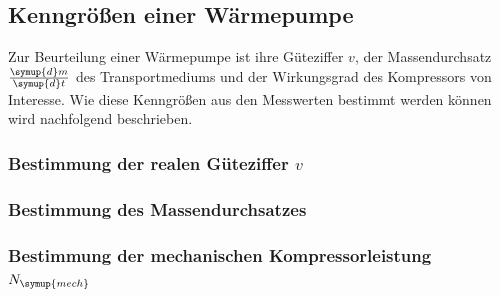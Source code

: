   \subsection{Kenngrößen einer Wärmepumpe}
  Zur Beurteilung einer Wärmepumpe ist ihre Güteziffer $v$, der Massendurchsatz
  $\frac{\symup{d}m}{\symup{d}t}$ des Transportmediums und der Wirkungsgrad des
  Kompressors von Interesse. Wie diese Kenngrößen aus den Messwerten bestimmt werden
  können wird nachfolgend beschrieben.
  \subsubsection{Bestimmung der realen Güteziffer $v$}

  \subsubsection{Bestimmung des Massendurchsatzes}
  \subsubsection{Bestimmung der mechanischen Kompressorleistung $N_\symup{mech}$}

\cite{sample}
